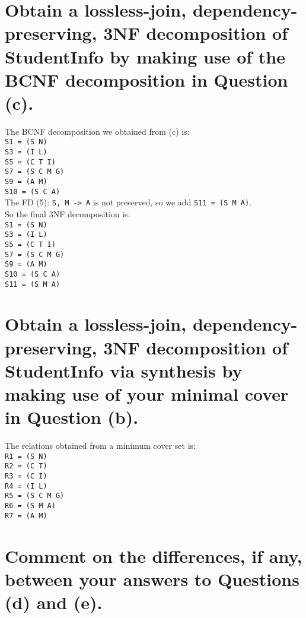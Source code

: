 \documentclass{article}
\begin{document}
\section{Obtain a lossless-join, dependency-preserving, 3NF decomposition of StudentInfo by
making use of the BCNF decomposition in Question (c).}
The BCNF decomposition we obtained from (c) is:\\
\texttt{S1 = (S N)} \\
\texttt{S3 = (I L)} \\
\texttt{S5 = (C T I)} \\
\texttt{S7 = (S C M G)} \\
\texttt{S9 = (A M)} \\
\texttt{S10 = (S C A)}\\
The FD (5): \texttt{S, M -> A} is not preserved, so we add \texttt{S11 = (S M A)}.\\
So the final 3NF decomposition is: \\
\texttt{S1 = (S N)} \\
\texttt{S3 = (I L)} \\
\texttt{S5 = (C T I)} \\
\texttt{S7 = (S C M G)} \\
\texttt{S9 = (A M)} \\
\texttt{S10 = (S C A)}\\
\texttt{S11 = (S M A)}\\

\section{Obtain a lossless-join, dependency-preserving, 3NF decomposition of StudentInfo via
synthesis by making use of your minimal cover in Question (b).}
The relations obtained from a minimum cover set is:\\
\texttt{R1 = (S N)}\\
\texttt{R2 = (C T)}\\
\texttt{R3 = (C I)}\\
\texttt{R4 = (I L)}\\
\texttt{R5 = (S C M G)}\\
\texttt{R6 = (S M A)}\\
\texttt{R7 = (A M)}\\



\section{Comment on the differences, if any, between your answers to Questions (d) and (e).}
\end{document}
